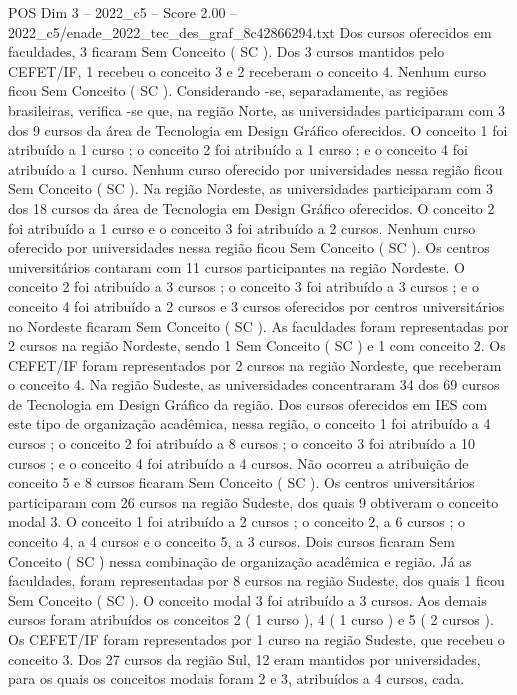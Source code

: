 \begin{textsample}{POS Dim 3 – 2022\_c5 – Score 2.00 – 2022\_c5/enade\_2022\_tec\_des\_graf\_8c42866294.txt}
Dos cursos oferecidos em faculdades, 3 ficaram Sem Conceito ( SC ).
Dos 3 cursos mantidos pelo CEFET/IF, 1 recebeu o conceito 3 e 2 receberam o conceito 4.
Nenhum curso ficou Sem Conceito ( SC ).
Considerando -se, separadamente, as regiões brasileiras, verifica -se que, na região Norte, as universidades participaram com 3 dos 9 cursos da área de Tecnologia em Design Gráfico oferecidos.
O conceito 1 foi atribuído a 1 curso ; o conceito 2 foi atribuído a 1 curso ; e o conceito 4 foi atribuído a 1 curso.
Nenhum curso oferecido por universidades nessa região ficou Sem Conceito ( SC ).
Na região Nordeste, as universidades participaram com 3 dos 18 cursos da área de Tecnologia em Design Gráfico oferecidos.
O conceito 2 foi atribuído a 1 curso e o conceito 3 foi atribuído a 2 cursos.
Nenhum curso oferecido por universidades nessa região ficou Sem Conceito ( SC ).
Os centros universitários contaram com 11 cursos participantes na região Nordeste.
O conceito 2 foi atribuído a 3 cursos ; o conceito 3 foi atribuído a 3 cursos ; e o conceito 4 foi atribuído a 2 cursos e 3 cursos oferecidos por centros universitários no Nordeste ficaram Sem Conceito ( SC ).
As faculdades foram representadas por 2 cursos na região Nordeste, sendo 1 Sem Conceito ( SC ) e 1 com conceito 2.
Os CEFET/IF foram representados por 2 cursos na região Nordeste, que receberam o conceito 4.
Na região Sudeste, as universidades concentraram 34 dos 69 cursos de Tecnologia em Design Gráfico da região.
Dos cursos oferecidos em IES com este tipo de organização acadêmica, nessa região, o conceito 1 foi atribuído a 4 cursos ; o conceito 2 foi atribuído a 8 cursos ; o conceito 3 foi atribuído a 10 cursos ; e o conceito 4 foi atribuído a 4 cursos.
Não ocorreu a atribuição de conceito 5 e 8 cursos ficaram Sem Conceito ( SC ).
Os centros universitários participaram com 26 cursos na região Sudeste, dos quais 9 obtiveram o conceito modal 3.
O conceito 1 foi atribuído a 2 cursos ; o conceito 2, a 6 cursos ; o conceito 4, a 4 cursos e o conceito 5, a 3 cursos.
Dois cursos ficaram Sem Conceito ( SC ) nessa combinação de organização acadêmica e região.
Já as faculdades, foram representadas por 8 cursos na região Sudeste, dos quais 1 ficou Sem Conceito ( SC ).
O conceito modal 3 foi atribuído a 3 cursos.
Aos demais cursos foram atribuídos os conceitos 2 ( 1 curso ), 4 ( 1 curso ) e 5 ( 2 cursos ).
Os CEFET/IF foram representados por 1 curso na região Sudeste, que recebeu o conceito 3.
Dos 27 cursos da região Sul, 12 eram mantidos por universidades, para os quais os conceitos modais foram 2 e 3, atribuídos a 4 cursos, cada.

\end{textsample}
